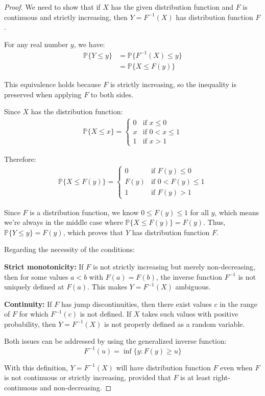\documentclass[letterpaper, 11pt]{article}
\newcommand{\1}{\mathds{1}}	%
\theoremstyle{definition}
\begin{document}
   \begin{proof}
    We need to show that if $X$ has the given distribution function and $F$ is continuous and strictly increasing, then $Y = F^{-1}(X)$ has distribution function $F$.

    For any real number $y$, we have:
    \begin{align*}
    \mathbb{P}\{Y \leq y\} &= \mathbb{P}\{F^{-1}(X) \leq y\} \\
    &= \mathbb{P}\{X \leq F(y)\}
    \end{align*}
    
    This equivalence holds because $F$ is strictly increasing, so the inequality is preserved when applying $F$ to both sides.
    
    Since $X$ has the distribution function:
    \begin{align*}
    \mathbb{P}\{X \leq x\} = 
    \begin{cases}
    0 & \text{if } x \leq 0 \\
    x & \text{if } 0 < x \leq 1 \\
    1 & \text{if } x > 1
    \end{cases}
    \end{align*}
    
    Therefore:
    \begin{align*}
    \mathbb{P}\{X \leq F(y)\} = 
    \begin{cases}
    0 & \text{if } F(y) \leq 0 \\
    F(y) & \text{if } 0 < F(y) \leq 1 \\
    1 & \text{if } F(y) > 1
    \end{cases}
    \end{align*}
    
    Since $F$ is a distribution function, we know $0 \leq F(y) \leq 1$ for all $y$, which means we're always in the middle case where $\mathbb{P}\{X \leq F(y)\} = F(y)$. Thus, $\mathbb{P}\{Y \leq y\} = F(y)$, which proves that $Y$ has distribution function $F$.
    
    Regarding the necessity of the conditions:
    
    \textbf{Strict monotonicity:} If $F$ is not strictly increasing but merely non-decreasing, then for some values $a < b$ with $F(a) = F(b)$, the inverse function $F^{-1}$ is not uniquely defined at $F(a)$. This makes $Y = F^{-1}(X)$ ambiguous.
    
    \textbf{Continuity:} If $F$ has jump discontinuities, then there exist values $c$ in the range of $F$ for which $F^{-1}(c)$ is not defined. If $X$ takes such values with positive probability, then $Y = F^{-1}(X)$ is not properly defined as a random variable.
    
    Both issues can be addressed by using the generalized inverse function:
    \[ F^{-1}(u) = \inf\{y: F(y) \geq u\} \]
    
    With this definition, $Y = F^{-1}(X)$ will have distribution function $F$ even when $F$ is not continuous or strictly increasing, provided that $F$ is at least right-continuous and non-decreasing.
   \end{proof}
\end{document}
